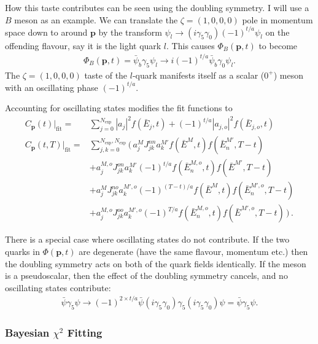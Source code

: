 How this taste contributes can be seen using the doubling symmetry. I will use a $B$ meson as an example. We can translate the $\zeta=(1,0,0,0)$ pole in momentum space down to around ${\textbf{p}}$ by the transform $\psi_l\to (i\gamma_5\gamma_0)(-1)^{t/a} \psi_l$ on the offending flavour, say it is the light quark $l$. This causes $\Phi_B({\textbf{p}},t)$ to become
\begin{align}
  \Phi_B({\textbf{p}},t) = \bar{\psi}_b\gamma_5\psi_l \to i(-1)^{t/a}\bar{\psi}_b\gamma_0\psi_l.
\end{align}
The $\zeta=(1,0,0,0)$ taste of the $l$-quark manifests itself as a scalar ($0^+$) meson with an oscillating phase $(-1)^{t/a}$.

Accounting for oscillating states modifies the fit functions to
\begin{align}
  \label{eq:2ptcorrelator_real}
  C_{\textbf{p}}(t)|_{\text{fit}} =& \sum_{j=0}^{N_{\text{exp}}} |a_j|^2 f(\bar{E}_j,t) + (-1)^{t/a} |a_{j,o}|^2 f(\bar{E}_{j,o},t)\, \\
  \nonumber
  C_{\textbf{p}}(t,T)|_{\text{fit}} =& \sum_{j,k=0}^{N_{\text{exp}},N_{\text{exp}}} \Big(\, a^{M}_j J^{nn}_{jk} a^{M'}_k f(\bar{E}^{M},t) f(\bar{E}^{M'}_n,T-t)
  \\ \nonumber
  &+a^{M,o}_j J^{on}_{jk} a^{M'}_k (-1)^{t/a} f(\bar{E}^{M,o}_n,t) f(\bar{E}^{M'},T-t)
  \\ \nonumber
  &+a^{M}_j J^{no}_{jk} a^{M',o}_k (-1)^{(T-t)/a} f(\bar{E}^{M},t) f(\bar{E}^{M',o}_n,T-t)
  \\
  &+a^{M,o}_j J^{oo}_{jk} a^{M',o}_k (-1)^{T/a} f(\bar{E}^{M,o}_n,t) f(\bar{E}^{M',o},T-t) \,\Big)\,.
  \label{eq:3ptcorrelator_real}
\end{align}

There is a special case where oscillating states do not contribute. If the two quarks in $\Phi({\textbf{p}},t)$ are degenerate (have the same flavour, momentum etc.) then the doubling symmetry acts on both of the quark fields identically. If the meson is a pseudoscalar, then the effect of the doubling symmetry cancels, and no oscillating states contribute:
\begin{align}
  \bar{\psi}\gamma_5 \psi \to (-1)^{2\times t/a} \bar{\psi} (i\gamma_5\gamma_0) \gamma_5 (i\gamma_5\gamma_0) \psi = \bar{\psi}\gamma_5\psi.
\end{align}

\subsubsection{Bayesian $\chi^2$ Fitting}

